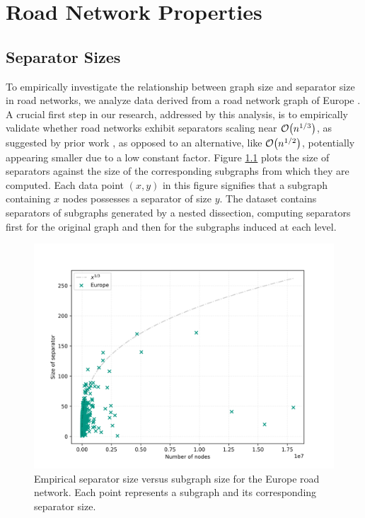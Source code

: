 \chapter{Road Network Properties}
\label{ch:properties}






\section{Separator Sizes}
\label{sec:empirical_analysis}

To empirically investigate the relationship between graph size and separator size in road networks, we analyze data derived from a road network graph of Europe \cite{ptv_group_dimacs-europe_2009}.
A crucial first step in our research, addressed by this analysis, is to empirically validate whether road networks exhibit separators scaling near \(\mathcal{O}\!\left(n^{1/3}\right)\), as suggested by prior work \cite{dibbelt_customizable_2016}, as opposed to an alternative, like \(\mathcal{O}\!\left(n^{1/2}\right)\), potentially appearing smaller due to a low constant factor.
Figure \cref{fig:separator_size_vs_graph_size} plots the size of separators against the size of the corresponding subgraphs from which they are computed.
Each data point \( (x, y) \) in this figure signifies that a subgraph containing \( x \) nodes possesses a separator of size \( y \).
The dataset contains separators of subgraphs generated by a nested dissection, computing separators first for the original graph and then for the subgraphs induced at each level.

\begin{figure}[tbhp]
	\centering
	\includegraphics[width=0.7\linewidth]{graphics/Europe.png}
	\caption{Empirical separator size versus subgraph size for the Europe road network. Each point represents a subgraph and its corresponding separator size.}
	\label{fig:separator_size_vs_graph_size}
\end{figure}

